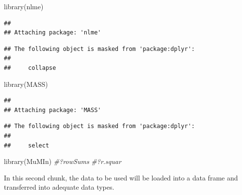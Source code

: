 \documentclass[
]{article}
\newenvironment{Shaded}{\begin{snugshade}}{\end{snugshade}}
\newcommand{\AttributeTok}[1]{\textcolor[rgb]{0.77,0.63,0.00}{#1}}
\newcommand{\CommentTok}[1]{\textcolor[rgb]{0.56,0.35,0.01}{\textit{#1}}}
\newcommand{\FunctionTok}[1]{\textcolor[rgb]{0.00,0.00,0.00}{#1}}
\newcommand{\NormalTok}[1]{#1}
\newcommand{\OtherTok}[1]{\textcolor[rgb]{0.56,0.35,0.01}{#1}}
\newcommand{\SpecialCharTok}[1]{\textcolor[rgb]{0.00,0.00,0.00}{#1}}
\newcommand{\StringTok}[1]{\textcolor[rgb]{0.31,0.60,0.02}{#1}}
\begin{document}
\begin{Shaded}
\begin{Highlighting}[]
\FunctionTok{library}\NormalTok{(nlme)}
\end{Highlighting}
\end{Shaded}

\begin{verbatim}
## 
## Attaching package: 'nlme'
\end{verbatim}

\begin{verbatim}
## The following object is masked from 'package:dplyr':
## 
##     collapse
\end{verbatim}

\begin{Shaded}
\begin{Highlighting}[]
\FunctionTok{library}\NormalTok{(MASS)}
\end{Highlighting}
\end{Shaded}

\begin{verbatim}
## 
## Attaching package: 'MASS'
\end{verbatim}

\begin{verbatim}
## The following object is masked from 'package:dplyr':
## 
##     select
\end{verbatim}

\begin{Shaded}
\begin{Highlighting}[]
\FunctionTok{library}\NormalTok{(MuMIn)}
\CommentTok{\#?rowSums}
\CommentTok{\#?r.squar}
\end{Highlighting}
\end{Shaded}

In this second chunk, the data to be used will be loaded into a data
frame and transferred into adequate data types.

\begin{Shaded}
\end{Shaded}
\end{document}
